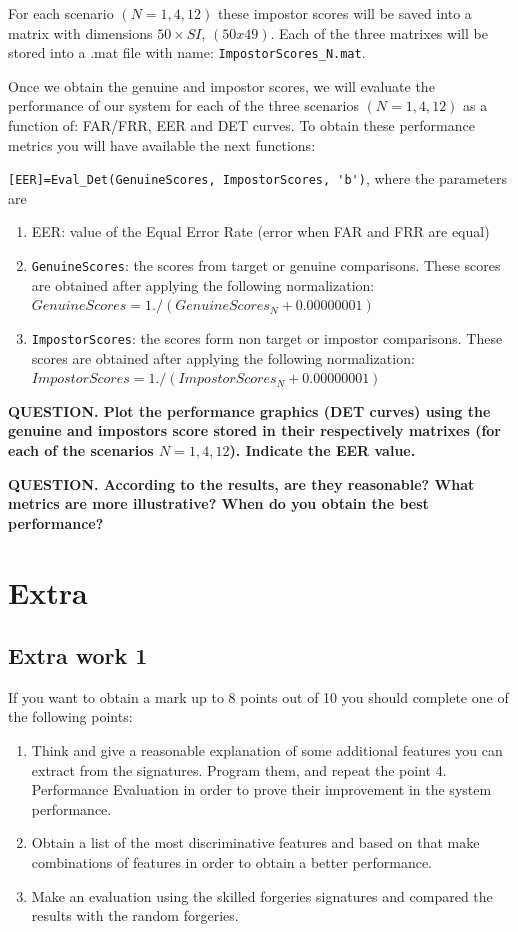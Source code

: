 \documentclass[a4paper]{article}
\def\inline{\lstinline[basicstyle=\ttfamily,keywordstyle={}]}
\begin{document}
{For each scenario \((N=1,4,12)\) these impostor scores will be saved into a matrix with dimensions \(50\times SI\), \((50x49)\). Each of the three matrixes will be stored into a .mat file with name: \inline{ImpostorScores_N.mat}.

Once we obtain the genuine and impostor scores, we will evaluate the performance of our system for each of the three scenarios \((N=1,4,12)\) as a function of: FAR/FRR, EER and DET curves.
To obtain these performance metrics you will have available the next functions:



\inline{[EER]=Eval_Det(GenuineScores, ImpostorScores, 'b')}, where the parameters are
\begin{enumerate}
\item	EER: value of the Equal Error Rate (error when FAR and FRR are equal)
\item	\inline{GenuineScores}: the scores from target or genuine comparisons. These scores are obtained after applying the following normalization: \(GenuineScores = 1./(GenuineScores_N+0.00000001)\)
\item	\inline{ImpostorScores}: the scores form non target or impostor comparisons. These scores are obtained after applying the following normalization: \(ImpostorScores =1./(ImpostorScores_N+0.00000001)\)
\end{enumerate}

\textbf{QUESTION. Plot the performance graphics (DET curves) using the genuine and impostors score stored in their respectively matrixes (for each of the scenarios \(N=1,4,12\)). Indicate the EER value.}


\textbf{QUESTION. According to the results, are they reasonable? What metrics are more illustrative? When do you obtain the best performance? }


\section{Extra}

\subsection{Extra work 1}
 If you want to obtain a mark up to 8 points out of 10 you should complete one of the following points:
 \begin{enumerate}
\item Think and give a reasonable explanation of some additional features you can extract from the signatures. Program them, and repeat the point 4. Performance Evaluation in order to prove their improvement in the system performance. 
\item 	Obtain a list of the most discriminative features and based on that make combinations of features in order to obtain a better performance.
\item 	Make an evaluation using the skilled forgeries signatures and compared the results with the random forgeries.
 \end{enumerate}

}
\end{document}
